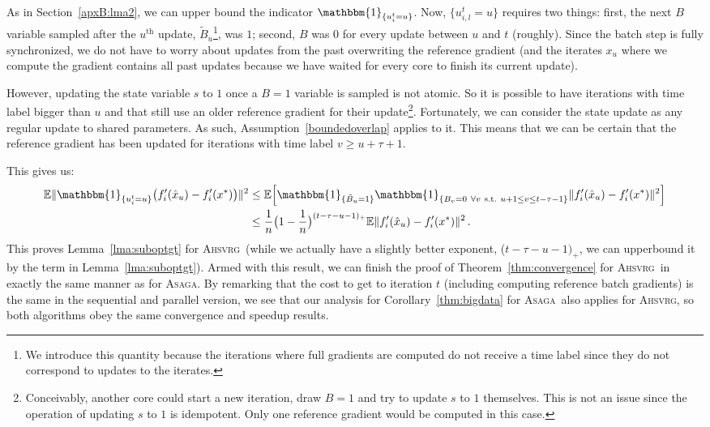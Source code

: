 \documentclass[twoside, 11pt]{article}
\newcommand{\overlap}{\tau}
\newcommand{\E}{\mathbb{E}}
\newcommand{\ind}{\mathbbm{1}}
\newcommand{\ASAGA}{\textsc{Asaga}}
\newcommand{\AHSVRG}{\textsc{Ahsvrg}}
\begin{document}
As in Section~\ref{apxB:lma2}, we can upper bound the indicator $\ind_{\{u_i^t = u\}}$.
Now, $\{u_{i, l}^t = u\}$ requires two things: first, the next $B$ variable sampled after the $u^\mathrm{th}$ update, $\tilde B_u$\footnote{We introduce this quantity because the iterations where full gradients are computed do not receive a time label since they do not correspond to updates to the iterates.}, was $1$; second, $B$ was $0$ for every update between $u$ and $t$ (roughly).
Since the batch step is fully synchronized, we do not have to worry about updates from the past overwriting the reference gradient (and the iterates $x_u$ where we compute the gradient contains all past updates because we have waited for every core to finish its current update).

However, updating the state variable $s$ to $1$ once a $B = 1$ variable is sampled is not atomic.
So it is possible to have iterations with time label bigger than $u$ and that still use an older reference gradient for their update\footnote{Conceivably, another core could start a new iteration, draw $B = 1$ and try to update $s$ to $1$ themselves. This is not an issue since the operation of updating $s$ to $1$ is idempotent. Only one reference gradient would be computed in this case.}.
Fortunately, we can consider the state update as any regular update to shared parameters.
As such, Assumption~\ref{boundedoverlap} applies to it.
This means that we can be certain that the reference gradient has been updated for iterations with time label $v \geq u + \overlap + 1$.

This gives us:
\begin{align}\label{lmaAHSVRG}
\E \| \ind_{\{u_i^t = u\}} \big(f'_i(\hat x_u) - f'_i(x^*)\big) \|^2
&\leq \E \Big[\ind_{\{\tilde B_u=1\}}
\ind_{\{B_v = 0 \ \forall v\ \text{s.t.}\ u + 1 \leq v \leq t-\overlap-1\}} \|f'_i(\hat x_u) - f'_i(x^*)\|^2 \Big]
\nonumber \\
&\leq \frac{1}{n} \big(1 - \frac{1}{n}\big)^{(t - \overlap - u - 1)_+} \E \|f'_i(\hat x_u) - f'_i(x^*)\|^2 \, .
\end{align}
This proves Lemma~\ref{lma:suboptgt} for \AHSVRG\ (while we actually have a slightly better exponent, ($t - \overlap - u - 1)_+$, we can upperbound it by the term in Lemma~\ref{lma:suboptgt}).
Armed with this result, we can finish the proof of Theorem~\ref{thm:convergence} for \AHSVRG\ in exactly the same manner as for \ASAGA.
By remarking that the cost to get to iteration $t$ (including computing reference batch gradients) is the same in the sequential and parallel version, we see that our analysis for Corollary~\ref{thm:bigdata} for \ASAGA\ also applies for \AHSVRG, so both algorithms obey the same convergence and speedup results.
\end{document}
